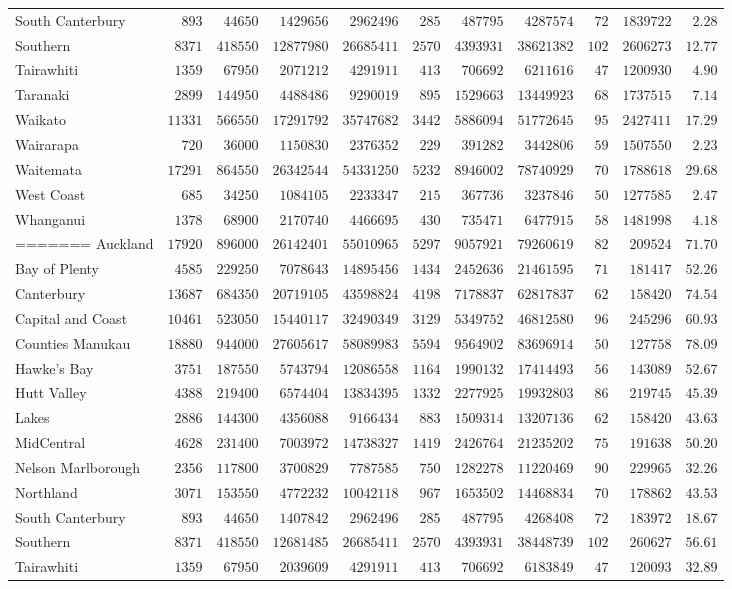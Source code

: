 \documentclass{article}
\begin{document}
\begin{itemize}
\begin{table}
\begin{center}
\begin{tabular}{lrrrrrrrrrr}
South Canterbury&$  893$&$ 44650$&$ 1429656$&$ 2962496$&$ 285$&$ 487795$&$ 4287574$&$ 72$&$1839722$&$ 2.28$\tabularnewline
Southern&$ 8371$&$418550$&$12877980$&$26685411$&$2570$&$4393931$&$38621382$&$102$&$2606273$&$12.77$\tabularnewline
Tairawhiti&$ 1359$&$ 67950$&$ 2071212$&$ 4291911$&$ 413$&$ 706692$&$ 6211616$&$ 47$&$1200930$&$ 4.90$\tabularnewline
Taranaki&$ 2899$&$144950$&$ 4488486$&$ 9290019$&$ 895$&$1529663$&$13449923$&$ 68$&$1737515$&$ 7.14$\tabularnewline
Waikato&$11331$&$566550$&$17291792$&$35747682$&$3442$&$5886094$&$51772645$&$ 95$&$2427411$&$17.29$\tabularnewline
Wairarapa&$  720$&$ 36000$&$ 1150830$&$ 2376352$&$ 229$&$ 391282$&$ 3442806$&$ 59$&$1507550$&$ 2.23$\tabularnewline
Waitemata&$17291$&$864550$&$26342544$&$54331250$&$5232$&$8946002$&$78740929$&$ 70$&$1788618$&$29.68$\tabularnewline
West Coast&$  685$&$ 34250$&$ 1084105$&$ 2233347$&$ 215$&$ 367736$&$ 3237846$&$ 50$&$1277585$&$ 2.47$\tabularnewline
Whanganui&$ 1378$&$ 68900$&$ 2170740$&$ 4466695$&$ 430$&$ 735471$&$ 6477915$&$ 58$&$1481998$&$ 4.18$\tabularnewline
=======
Auckland&$17920$&$896000$&$26142401$&$55010965$&$5297$&$9057921$&$79260619$&$ 82$&$209524$&$71.70$\tabularnewline
Bay of Plenty&$ 4585$&$229250$&$ 7078643$&$14895456$&$1434$&$2452636$&$21461595$&$ 71$&$181417$&$52.26$\tabularnewline
Canterbury&$13687$&$684350$&$20719105$&$43598824$&$4198$&$7178837$&$62817837$&$ 62$&$158420$&$74.54$\tabularnewline
Capital and Coast&$10461$&$523050$&$15440117$&$32490349$&$3129$&$5349752$&$46812580$&$ 96$&$245296$&$60.93$\tabularnewline
Counties Manukau&$18880$&$944000$&$27605617$&$58089983$&$5594$&$9564902$&$83696914$&$ 50$&$127758$&$78.09$\tabularnewline
Hawke's Bay&$ 3751$&$187550$&$ 5743794$&$12086558$&$1164$&$1990132$&$17414493$&$ 56$&$143089$&$52.67$\tabularnewline
Hutt Valley&$ 4388$&$219400$&$ 6574404$&$13834395$&$1332$&$2277925$&$19932803$&$ 86$&$219745$&$45.39$\tabularnewline
Lakes&$ 2886$&$144300$&$ 4356088$&$ 9166434$&$ 883$&$1509314$&$13207136$&$ 62$&$158420$&$43.63$\tabularnewline
MidCentral&$ 4628$&$231400$&$ 7003972$&$14738327$&$1419$&$2426764$&$21235202$&$ 75$&$191638$&$50.20$\tabularnewline
Nelson Marlborough&$ 2356$&$117800$&$ 3700829$&$ 7787585$&$ 750$&$1282278$&$11220469$&$ 90$&$229965$&$32.26$\tabularnewline
Northland&$ 3071$&$153550$&$ 4772232$&$10042118$&$ 967$&$1653502$&$14468834$&$ 70$&$178862$&$43.53$\tabularnewline
South Canterbury&$  893$&$ 44650$&$ 1407842$&$ 2962496$&$ 285$&$ 487795$&$ 4268408$&$ 72$&$183972$&$18.67$\tabularnewline
Southern&$ 8371$&$418550$&$12681485$&$26685411$&$2570$&$4393931$&$38448739$&$102$&$260627$&$56.61$\tabularnewline
Tairawhiti&$ 1359$&$ 67950$&$ 2039609$&$ 4291911$&$ 413$&$ 706692$&$ 6183849$&$ 47$&$120093$&$32.89$\tabularnewline

\end{tabular}
\end{center}
\end{table}
\end{itemize}
\end{document}
